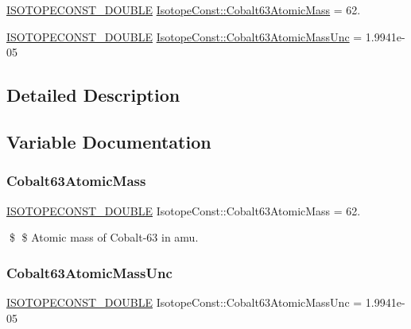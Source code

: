 \begin{DoxyCompactItemize}
\item 
\mbox{\hyperlink{group___isotope_const-_macros_ga8f45a7272ce02c0b4c65c44636ed719a}{I\+S\+O\+T\+O\+P\+E\+C\+O\+N\+S\+T\+\_\+\+D\+O\+U\+B\+LE}} \mbox{\hyperlink{group___isotope_const-_cobalt-_co63_ga09f1fd0582c2bf8c5a9b8a28570a013d}{Isotope\+Const\+::\+Cobalt63\+Atomic\+Mass}} = 62.
\item 
\mbox{\hyperlink{group___isotope_const-_macros_ga8f45a7272ce02c0b4c65c44636ed719a}{I\+S\+O\+T\+O\+P\+E\+C\+O\+N\+S\+T\+\_\+\+D\+O\+U\+B\+LE}} \mbox{\hyperlink{group___isotope_const-_cobalt-_co63_gab3b7af2a913eb86d6d17a6875121481d}{Isotope\+Const\+::\+Cobalt63\+Atomic\+Mass\+Unc}} = 1.\+9941e-\/05
\end{DoxyCompactItemize}


\subsection{Detailed Description}


\subsection{Variable Documentation}
\mbox{\label{group___isotope_const-_cobalt-_co63_ga09f1fd0582c2bf8c5a9b8a28570a013d}} 
\subsubsection{\texorpdfstring{Cobalt63\+Atomic\+Mass}{Cobalt63AtomicMass}}
{\footnotesize\ttfamily \mbox{\hyperlink{group___isotope_const-_macros_ga8f45a7272ce02c0b4c65c44636ed719a}{I\+S\+O\+T\+O\+P\+E\+C\+O\+N\+S\+T\+\_\+\+D\+O\+U\+B\+LE}} Isotope\+Const\+::\+Cobalt63\+Atomic\+Mass = 62.}

\$ \$ Atomic mass of Cobalt-\/63 in amu. \mbox{\label{group___isotope_const-_cobalt-_co63_gab3b7af2a913eb86d6d17a6875121481d}} 
\subsubsection{\texorpdfstring{Cobalt63\+Atomic\+Mass\+Unc}{Cobalt63AtomicMassUnc}}
{\footnotesize\ttfamily \mbox{\hyperlink{group___isotope_const-_macros_ga8f45a7272ce02c0b4c65c44636ed719a}{I\+S\+O\+T\+O\+P\+E\+C\+O\+N\+S\+T\+\_\+\+D\+O\+U\+B\+LE}} Isotope\+Const\+::\+Cobalt63\+Atomic\+Mass\+Unc = 1.\+9941e-\/05}

